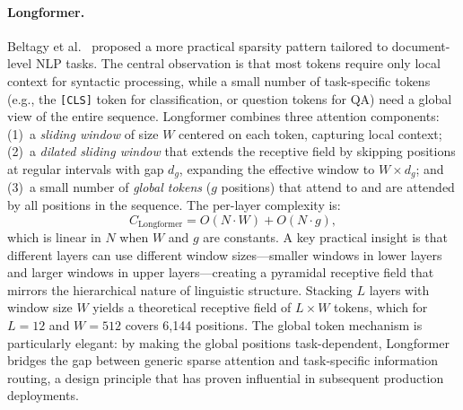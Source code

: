 \paragraph{Longformer.}
Beltagy et al.~\cite{beltagy2020longformer} proposed a more practical sparsity pattern tailored to document-level NLP tasks. The central observation is that most tokens require only local context for syntactic processing, while a small number of task-specific tokens (e.g., the \texttt{[CLS]} token for classification, or question tokens for QA) need a global view of the entire sequence. Longformer combines three attention components: (1)~a \emph{sliding window} of size $W$ centered on each token, capturing local context; (2)~a \emph{dilated sliding window} that extends the receptive field by skipping positions at regular intervals with gap $d_g$, expanding the effective window to $W \times d_g$; and (3)~a small number of \emph{global tokens} ($g$ positions) that attend to and are attended by all positions in the sequence. The per-layer complexity is:
\begin{equation}
C_{\text{Longformer}} = O(N \cdot W) + O(N \cdot g),
\label{eq:longformer-complexity}
\end{equation}
which is linear in $N$ when $W$ and $g$ are constants. A key practical insight is that different layers can use different window sizes---smaller windows in lower layers and larger windows in upper layers---creating a pyramidal receptive field that mirrors the hierarchical nature of linguistic structure. Stacking $L$ layers with window size $W$ yields a theoretical receptive field of $L \times W$ tokens, which for $L = 12$ and $W = 512$ covers 6,144 positions. The global token mechanism is particularly elegant: by making the global positions task-dependent, Longformer bridges the gap between generic sparse attention and task-specific information routing, a design principle that has proven influential in subsequent production deployments.

